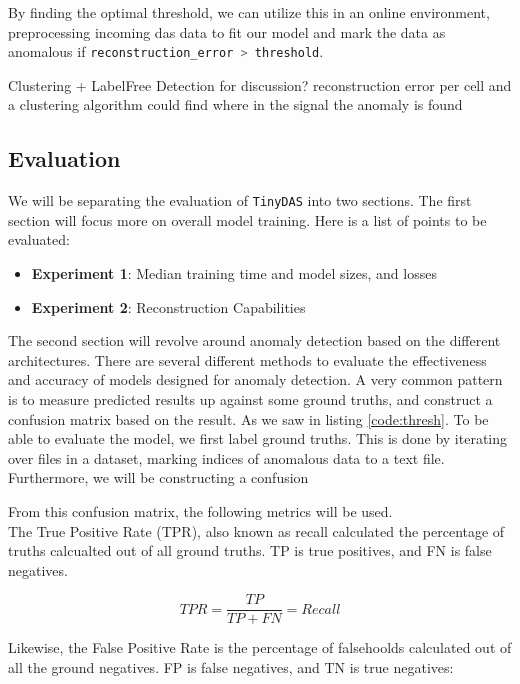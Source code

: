 By finding the optimal threshold, we can utilize this in an online environment, preprocessing incoming \acrshort{das} data to fit our model and mark the data as anomalous if \lstinline[language=Julia]{reconstruction_error > threshold}. 

Clustering + LabelFree Detection for discussion? reconstruction error per cell and a clustering algorithm could find where in the signal the anomaly is found

\subsection{Evaluation}

We will be separating the evaluation of \texttt{TinyDAS} into two sections. The first section will focus more on overall model training. Here is a list of points to be evaluated: 

\begin{itemize}
    \item \textbf{Experiment 1}: Median training time and model sizes, and losses
    \item \textbf{Experiment 2}: Reconstruction Capabilities
\end{itemize}

The second section will revolve around anomaly detection based on the different architectures. There are several different methods to evaluate the effectiveness and accuracy of models designed for anomaly detection. A very common pattern is to measure predicted results up against some ground truths, and construct a confusion matrix based on the result. As we saw in listing \ref{code:thresh}. To be able to evaluate the model, we first label ground truths. This is done by iterating over files in a dataset, marking indices of anomalous data to a text file. Furthermore, we will be constructing a confusion 

From this confusion matrix, the following metrics will be used. \\ 


The True Positive Rate (TPR), also known as recall calculated the percentage of truths calcualted out of all ground truths. TP is true positives, and FN is false negatives. 

\begin{equation}
    TPR = \frac{TP}{TP + FN} = Recall
\end{equation}

Likewise, the False Positive Rate is the percentage of falsehoolds calculated out of all the ground negatives. FP is false negatives, and TN is true negatives:

